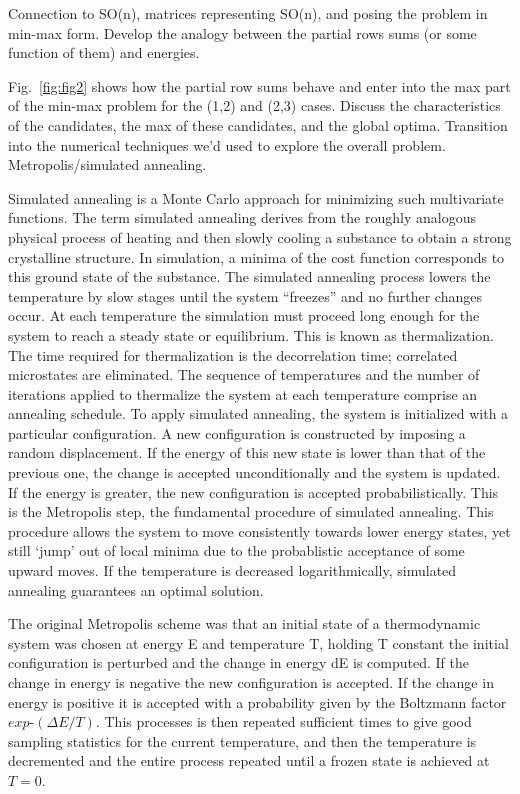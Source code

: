\documentclass[superscriptaddress,reprint,amsmath,amssymb,aps]{revtex4-1}
\begin{document}
\vspace{.15in}

Connection to SO(n), matrices representing SO(n), and posing the problem in
min-max form.  Develop the analogy between the partial rows sums (or some
function of them) and energies.

Fig.~\ref{fig:fig2} shows how the partial row sums behave and enter into the max part of
the min-max problem for the (1,2) and (2,3) cases.  Discuss the
characteristics of the candidates, the max of these candidates, and the
global optima.  Transition into the numerical techniques we'd used to
explore the overall problem.  Metropolis/simulated annealing.

\vspace{.15in}

Simulated annealing is a Monte Carlo approach for minimizing such
multivariate functions. The term simulated annealing derives from the
roughly analogous physical process of heating and then slowly cooling a
substance to obtain a strong crystalline structure. In simulation, a minima
of the cost function corresponds to this ground state of the substance. The
simulated annealing process lowers the temperature by slow stages until the
system ``freezes'' and no further changes occur. At each temperature the
simulation must proceed long enough for the system to reach a steady state
or equilibrium. This is known as thermalization. The time required for
thermalization is the decorrelation time; correlated microstates are
eliminated. The sequence of temperatures and the number of iterations
applied to thermalize the system at each temperature comprise an annealing
schedule.  To apply simulated annealing, the system is initialized with a
particular configuration. A new configuration is constructed by imposing a
random displacement. If the energy of this new state is lower than that of
the previous one, the change is accepted unconditionally and the system is
updated. If the energy is greater, the new configuration is accepted
probabilistically. This is the Metropolis step, the fundamental procedure
of simulated annealing. This procedure allows the system to move
consistently towards lower energy states, yet still ‘jump’ out of local
minima due to the probablistic acceptance of some upward moves. If the
temperature is decreased logarithmically, simulated annealing guarantees an
optimal solution.

The original Metropolis scheme was that an initial state of a thermodynamic
system was chosen at energy E and temperature T, holding T constant the
initial configuration is perturbed and the change in energy dE is computed.
If the change in energy is negative the new configuration is accepted. If
the change in energy is positive it is accepted with a probability given by
the Boltzmann factor $exp ‐(\Delta E/T)$.  This processes is then repeated
sufficient times to give good sampling statistics for the current
temperature, and then the temperature is decremented and the entire process
repeated until a frozen state is achieved at $T=0$.
\end{document}
